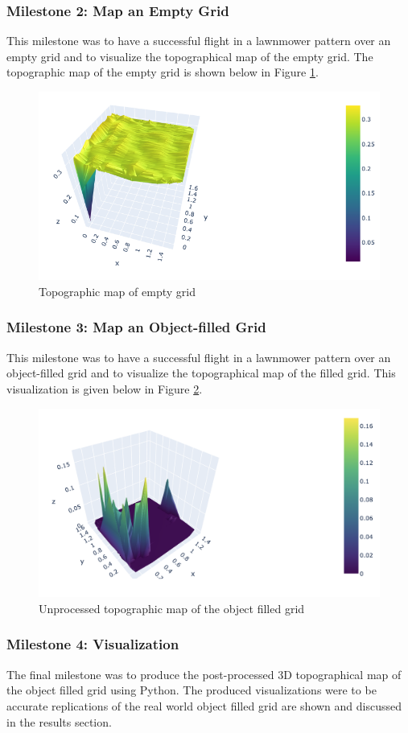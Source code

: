 \subsubsection{Milestone 2: Map an Empty Grid}
This milestone was to have a successful flight in a lawnmower pattern over an empty grid and to visualize the topographical map of the empty grid. The topographic map of the empty grid is shown below in Figure \ref{fig:m2}.

\begin{figure}[H]
  \centering
  \includegraphics[width=0.8\linewidth]{Technical/m2.png}  
  \caption{Topographic map of empty grid}
  \label{fig:m2}
\end{figure}

\subsubsection{Milestone 3: Map an Object-filled Grid}
This milestone was to have a successful flight in a lawnmower pattern over an object-filled grid and to visualize the topographical map of the filled grid. This visualization is given below in Figure \ref{fig:m3}.

\begin{figure}[H]
  \centering
  \includegraphics[width=0.8\linewidth]{Technical/m3.png}  
  \caption{Unprocessed topographic map of the object filled grid}
  \label{fig:m3}
\end{figure}

\subsubsection{Milestone 4: Visualization}
The final milestone was to produce the post-processed 3D topographical map of the object filled grid using Python. The produced visualizations were to be accurate replications of the real world object filled grid are shown and discussed in the results section.